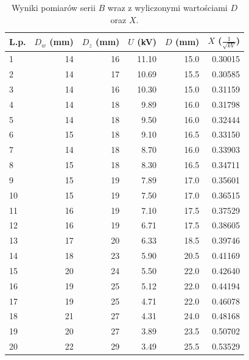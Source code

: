 \documentclass[a4paper]{article}
\begin{document}
\begin{table}
\centering

\begin{tabular}{lrrrrr}
\toprule
L.p. &  $D_w$ (mm) &  $D_z$ (mm) &  $U$ (kV) &  $D$ (mm) &  $X$ ($\frac{1}{\sqrt{kV}}$) \\
\midrule
1  &          14 &          16 &     11.10 &      15.0 &                     0.30015 \\
2  &          14 &          17 &     10.69 &      15.5 &                     0.30585 \\
3  &          14 &          16 &     10.30 &      15.0 &                     0.31159 \\
4  &          14 &          18 &      9.89 &      16.0 &                     0.31798 \\
5  &          14 &          18 &      9.50 &      16.0 &                     0.32444 \\
6  &          15 &          18 &      9.10 &      16.5 &                     0.33150 \\
7  &          14 &          18 &      8.70 &      16.0 &                     0.33903 \\
8  &          15 &          18 &      8.30 &      16.5 &                     0.34711 \\
9  &          15 &          19 &      7.89 &      17.0 &                     0.35601 \\
10 &          15 &          19 &      7.50 &      17.0 &                     0.36515 \\
11 &          16 &          19 &      7.10 &      17.5 &                     0.37529 \\
12 &          16 &          19 &      6.71 &      17.5 &                     0.38605 \\
13 &          17 &          20 &      6.33 &      18.5 &                     0.39746 \\
14 &          18 &          23 &      5.90 &      20.5 &                     0.41169 \\
15 &          20 &          24 &      5.50 &      22.0 &                     0.42640 \\
16 &          19 &          25 &      5.12 &      22.0 &                     0.44194 \\
17 &          19 &          25 &      4.71 &      22.0 &                     0.46078 \\
18 &          21 &          27 &      4.31 &      24.0 &                     0.48168 \\
19 &          20 &          27 &      3.89 &      23.5 &                     0.50702 \\
20 &          22 &          29 &      3.49 &      25.5 &                     0.53529 \\
\bottomrule
\end{tabular}

\caption{Wyniki pomiarów serii $B$ wraz z wyliczonymi wartościami $D$ oraz $X$.}
\label{seria_B}
\end{table}
\end{document}
